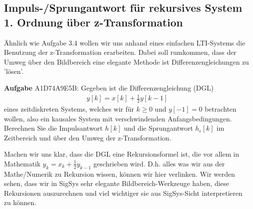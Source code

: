 \subsection{Impuls-/Sprungantwort für rekursives System 1. Ordnung über z-Transformation}
\label{sec:A1D74A9E5B}
\begin{Ziel}
Ähnlich wie Aufgabe 3.4 wollen wir uns anhand eines einfachen LTI-Systems
die Benutzung der z-Transformation erarbeiten. Dabei soll rumkommen, dass
der Umweg über den Bildbereich eine elegante Methode ist Differenzengleichungen
zu 'lösen'.
\end{Ziel}
\textbf{Aufgabe} {\tiny A1D74A9E5B}: Gegeben ist die Differenzengleichung (DGL)
\begin{align}
y[k] = x[k] + \frac{1}{2} y[k-1]
\end{align}
eines zeitdiskreten Systems, welches wir für $k \geq 0$ und $y[-1]=0$ betrachten
wollen, also ein kausales System mit verschwindenden Anfangsbedingungen.
Berechnen Sie die Impulsantwort $h[k]$ und die Sprungantwort $h_\epsilon[k]$
im Zeitbereich und über den Umweg der z-Transformation.
\begin{Werkzeug}
Machen wir uns klar, dass die DGL eine Rekursionsformel ist, die vor allem
in Mathematik $y_k = x_k + \frac{1}{2} y_{k-1}$ geschrieben wird. D.h. alles
was wir aus der Mathe/Numerik zu Rekursion wissen, können wir hier verlinken.
Wir werden sehen, dass wir in SigSys sehr elegante Bildbereich-Werkzeuge haben,
diese Rekursionen auszurechnen und viel wichtiger sie aus SigSys-Sicht
interpretieren zu können.
\end{Werkzeug}
